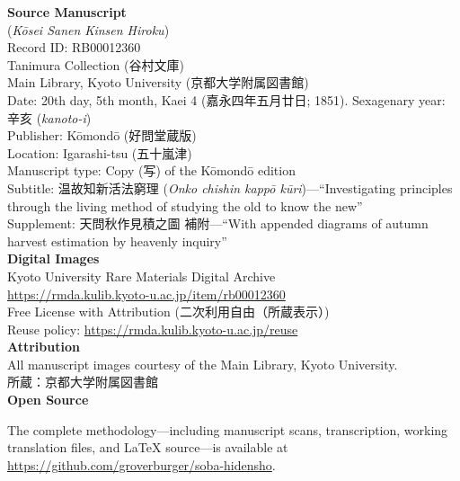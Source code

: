 \documentclass[10pt, openany]{book}
\newcommand{\jp}[1]{{\japanesefont #1}}
\begin{document}
\begin{small}
\noindent\textbf{Source Manuscript}\\[0.3em]
\noindent\jp{校正三猿金泉秘録} (\textit{K\=osei Sanen Kinsen Hiroku})\\
Record ID: RB00012360\\
Tanimura Collection (\jp{谷村文庫})\\
Main Library, Kyoto University (\jp{京都大学附属図書館})\\[0.5em]
Date: 20th day, 5th month, Kaei 4 (\jp{嘉永四年五月廿日}; 1851).
Sexagenary year: \jp{辛亥} (\textit{kanoto-i})\\
Publisher: K\=omond\=o (\jp{好問堂蔵版})\\
Location: Igarashi-tsu (\jp{五十嵐津})\\
Manuscript type: Copy (\jp{写}) of the K\=omond\=o edition\\
Subtitle: \jp{温故知新活法窮理} (\textit{Onko chishin kapp\=o
k\=uri})---``Investigating principles through the living method of
studying the old to know the new''\\
Supplement: \jp{天問秋作見積之圖 補附}---``With appended diagrams of
autumn harvest estimation by heavenly inquiry''\\[1em]

\noindent\textbf{Digital Images}\\[0.3em]
\noindent Kyoto University Rare Materials Digital Archive\\
\url{https://rmda.kulib.kyoto-u.ac.jp/item/rb00012360}\\[0.5em]
Free License with Attribution (\jp{二次利用自由（所蔵表示）})\\
Reuse policy: \url{https://rmda.kulib.kyoto-u.ac.jp/reuse}\\[1em]

\noindent\textbf{Attribution}\\[0.3em]
\noindent All manuscript images courtesy of the Main Library, Kyoto University.\\
\jp{所蔵：京都大学附属図書館}\\[1em]

\noindent\textbf{Open Source}\\[0.3em]
\begin{sloppypar}\noindent The complete methodology---including
manuscript scans, transcription, working translation files, and
\LaTeX{} source---is available at
\url{https://github.com/groverburger/soba-hidensho}.
\end{sloppypar}
\end{small}
\newpage
\end{document}
